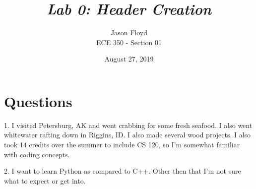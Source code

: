 \documentclass[12pt]{report}
\begin{document}
   \title{
            \LARGE\textbf\textit{{Lab 0: Header Creation}}}
                \author{\normalsize Jason Floyd \\
                    \normalsize ECE 350 - Section 01 }
                    \date{August 27, 2019}

    \maketitle
    
    \newpage
    

\section{Questions}

 1. I visited Petersburg, AK and went crabbing for some fresh seafood. I also went whitewater rafting down in Riggins, ID. I also made several wood projects. I also took 14 credits over the summer to include CS 120, so I'm somewhat familiar with coding concepts.
 
 2. I want to learn Python as compared to C++. Other then that I'm not sure what to expect or get into.
\end{document}
